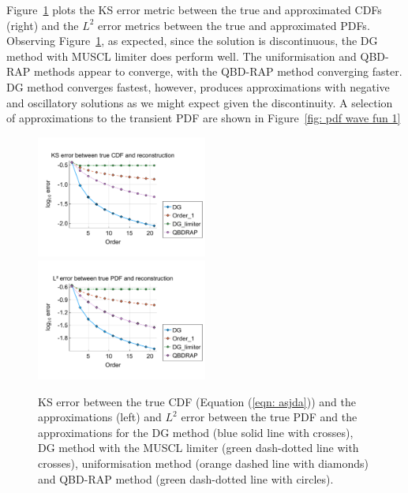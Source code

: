 \begin{example}
	Figure~\ref{fig: fun 1 wave} plots the KS error metric between the true and approximated CDFs (right) and the \(L^2\) error metrics between the true and approximated PDFs. Observing Figure~\ref{fig: fun 1 wave}, as expected, since the solution is discontinuous, the DG method with MUSCL limiter does perform well. The uniformisation and QBD-RAP methods appear to converge, with the QBD-RAP method converging faster. DG method converges fastest, however, produces approximations with negative and oscillatory solutions as we might expect given the discontinuity. A selection of approximations to the transient PDF are shown in Figure~\ref{fig: pdf wave fun 1}
	\begin{figure}
		\centering
		\includegraphics[width=0.5\textwidth,trim={0.75cm 0.8cm 0.25cm 1.25cm},clip]{chapter6/figs/wave/fun1/meshs_ks_error_formatted.pdf}%
		\includegraphics[width=0.5\textwidth,trim={0.75cm 0.8cm 0.25cm 1.25cm},clip]{chapter6/figs/wave/fun1/meshs_l2_pdf_error_formatted.pdf}
		\caption{KS error between the true CDF (Equation (\ref{eqn: asjda})) and the approximations (left) and \(L^2\) error between the true PDF and the approximations for the DG method (blue solid line with crosses), DG method with the MUSCL limiter (green dash-dotted line with crosses), uniformisation method (orange dashed line with diamonds) and QBD-RAP method (green dash-dotted line with circles).} 
		\label{fig: fun 1 wave} 
	\end{figure}
	\begin{figure}
		\centering

\end{figure}
\end{example}
